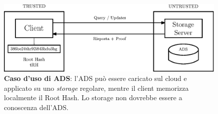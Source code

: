 		\begin{figure}
			\centering
			\includegraphics[scale=0.75]{figure/trusted-untrusted.eps}
			\caption{\textbf{Caso d'uso di ADS}: l'ADS può essere caricato sul cloud e applicato su uno \textit{storage} regolare, mentre il client memorizza localmente il Root Hash. Lo storage non dovrebbe essere a conoscenza dell'ADS.}\label{fig:3}
		\end{figure}
		
